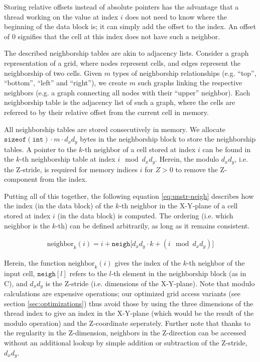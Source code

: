 Storing relative offsets instead of absolute pointers has the advantage that a thread working on the value at index $i$ does not need to know where the beginning of the data block is; it can simply add the offset to the index. An offset of $0$ signifies that the cell at this index does not have such a neighbor.

The described neighborship tables are akin to adjacency lists\cite[Chapter 12]{DSA}. Consider a graph representation of a grid, where nodes represent cells, and edges represent the neighborship of two cells. Given $m$ types of neighborship relationships (e.g. ``top'', ``bottom'', ``left'' and ``right''), we create $m$ such graphs linking the respective neighbors (e.g. a graph connecting all nodes with their ``upper'' neighbor). Each neighborship table is the adjacency list of such a graph, where the cells are referred to by their relative offset from the current cell in memory. 

All neighborship tables are stored consecutively in memory. We allocate $\mathtt{sizeof(int)}\cdot m \cdot d_x d_y$ bytes in the neighborship block to store the neighborship tables. A pointer to the $k$-th neighbor of a cell stored at index $i$ can be found in the $k$-th neighborship table at index $i \mod d_xd_y$. Herein, the modulo $d_xd_y$, i.e. the Z-stride, is required for memory indices $i$ for $Z>0$ to remove the Z-component from the index.

Putting all of this together, the following equation \ref{eq:unstr-neigh} describes how the index (in the data block) of the $k$-th neighbor in the X-Y-plane of a cell stored at index $i$ (in the data block) is computed. The ordering (i.e. which neighbor is the $k$-th) can be defined arbitrarily, as long as it remains consistent.

\begin{gather}
	\text{neighbor}_k(i) = i + \mathtt{neigh[}d_xd_y\cdot k + (i \mod d_xd_y)\mathtt{]} \label{eq:unstr-neigh}
\end{gather}

Herein, the function $\text{neighbor}_k(i)$ gives the index of the $k$-th neighbor of the input cell, $\mathtt{neigh}[l]$ refers to the $l$-th element in the neighborship block (as in C), and $d_xd_y$ is the Z-stride (i.e. dimensions of the X-Y-plane). Note that modulo calculations are expensive operations; our optimized grid access variants (see section \ref{sec:optimizations}) thus avoid those by using the three dimensions of the thread index to give an index in the X-Y-plane (which would be the result of the modulo operation) and the Z-coordinate seperately. Further note that thanks to the regularity in the Z-dimension, neighbors in the Z-direction can be accessed without an additional lookup by simple addition or subtraction of the Z-stride, $d_xd_y$.

